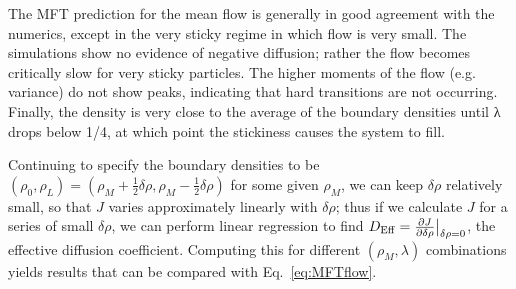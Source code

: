 The MFT prediction for the mean flow is generally in good agreement with the numerics, except in the very sticky regime in which flow is very small.
The simulations show no evidence of negative diffusion; rather the flow becomes critically slow for very sticky particles.
The higher moments of the flow (e.g. variance) do not show peaks, indicating that hard transitions are not occurring.
Finally, the density is very close to the average of the boundary densities until λ drops below 1/4, at which point the stickiness causes the system to fill.

Continuing to specify the boundary densities to be $(\rho_0, \rho_L) = (\rho_M + \frac{1}{2} \delta\rho, \rho_M - \frac{1}{2} \delta\rho)$ for some given $\rho_M$, we can keep $\delta\rho$ relatively small, so that $J$ varies approximately
linearly with $\delta\rho$; thus if we calculate $J$ for a series of small $\delta \rho$, we can perform linear regression to find $D_\mathrm{Eff}=\frac{\partial J}{\partial \delta\rho}\big|_{\delta\rho=0}$, the effective diffusion coefficient.
Computing this for different $(\rho_M, \lambda)$ combinations yields results that can be compared with Eq.~\ref{eq:MFTflow}.
